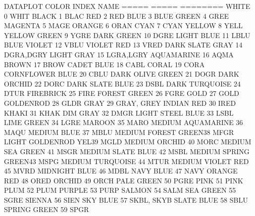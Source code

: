  
                                    DATAPLOT
        COLOR             INDEX     NAME
        =====             =====     ========
        WHITE               0       WHIT
        BLACK               1       BLAC
        RED                 2       RED
        BLUE                3       BLUE
        GREEN               4       GREE
        MAGENTA             5       MAGE
        ORANGE              6       ORAN
        CYAN                7       CYAN
        YELLOW              8       YELL
        YELLOW GREEN        9       YGRE
        DARK GREEN         10       DGRE
        LIGHT BLUE         11       LBLU
        BLUE VIOLET        12       VBLU
        VIOLET RED         13       VRED
        DARK SLATE GRAY    14       DGRA,DGRY
        LIGHT GRAY         15       LGRA,LGRY
        AQUAMARINE         16       AQMA
        BROWN              17       BROW
        CADET BLUE         18       CABL
        CORAL              19       CORA
        CORNFLOWER BLUE    20       CBLU
        DARK OLIVE GREEN   21       DOGR
        DARK ORCHID        22       DORC
        DARK SLATE BLUE    23       DSBL
        DARK TURQUOISE     24       DTUR
        FIREBRICK          25       FIRE
        FOREST GREEN       26       FGRE
        GOLD               27       GOLD
        GOLDENROD          28       GLDR
        GRAY               29       GRAY, GREY
        INDIAN RED         30       IRED
        KHAKI              31       KHAK
        DIM GRAY           32       DMGR
        LIGHT STEEL BLUE   33       LSBL
        LIME GREEN         34       LGRE
        MAROON             35       MARO
        MEDIUM AQUAMARINE  36       MAQU
        MEDIUM BLUE        37       MBLU
        MEDIUM FOREST GREEN38       MFGR
        LIGHT GOLDENROD YEL39       MGLD
        MEDIUM ORCHID      40       MORC
        MEDIUM SEA GREEN   41       MSGR
        MEDIUM SLATE BLUE  42       MSBL
        MEDIUM SPRING GREEN43       MSPG
        MEDIUM TURQUOISE   44       MTUR
        MEDIUM VIOLET RED  45       MVRD
        MIDNIGHT BLUE      46       MDBL
        NAVY BLUE          47       NAVY
        ORANGE RED         48       ORED
        ORCHID             49       ORCH
        PALE GREEN         50       PGRE
        PINK               51       PINK
        PLUM               52       PLUM
        PURPLE             53       PURP
        SALMON             54       SALM
        SEA GREEN          55       SGRE
        SIENNA             56       SIEN
        SKY BLUE           57       SKBL, SKYB
        SLATE BLUE         58       SBLU
        SPRING GREEN       59       SPGR
